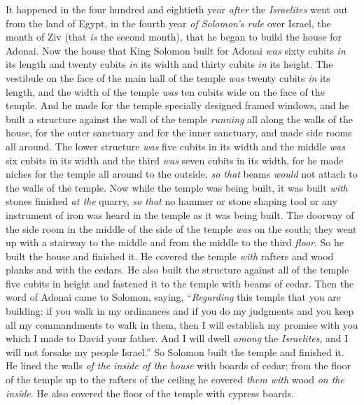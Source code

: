 \begin{biblechapter} %
 It happened in the four hundred and eightieth year \textit{after} the \textit{Israelites} went out from the land of Egypt, in the fourth year \textit{of Solomon’s rule} over Israel, the month of Ziv (that \textit{is} the second month), that he began to build the house for Adonai.
\verse Now the house that King Solomon built for Adonai \textit{was} sixty cubits \textit{in} its length and twenty cubits \textit{in} its width and thirty cubits \textit{in} its height.
\verse The vestibule on the face of the main hall of the temple \textit{was} twenty cubits \textit{in} its length, and the width of the temple \textit{was} ten cubits wide on the face of the temple.
\verse And he made for the temple specially designed framed windows,
\verse and he built a structure against the wall of the temple \textit{running} all along the walls of the house, for the outer sanctuary and for the inner sanctuary, and made side rooms all around.
\verse The lower structure \textit{was} five cubits in its width and the middle \textit{was} six cubits in its width and the third \textit{was} seven cubits in its width, for he made niches for the temple all around to the outside, \textit{so that} beams \textit{would} not attach to the walls of the temple.
\verse Now while the temple was being built, it was built \textit{with} stones finished \textit{at the} quarry, \textit{so that} no hammer or stone shaping tool or any instrument of iron was heard in the temple as it was being built.
\verse The doorway of the side room in the middle of the side of the temple \textit{was} on the south; they went up with a stairway to the middle and from the middle to the third \textit{floor}.
\verse So he built the house and finished it. He covered the temple \textit{with} rafters and wood planks and with the cedars.
\verse He also built the structure against all of the temple five cubits in height and fastened it to the temple with beams of cedar.
\verse Then the word of Adonai came to Solomon, saying,
\verse “\textit{Regarding} this temple that you are building: if you walk in my ordinances and if you do my judgments and you keep all my commandments to walk in them, then I will establish my promise with you which I made to David your father.
\verse And I will dwell \textit{among} the \textit{Israelites}, and I will not forsake my people Israel.”
\verse So Solomon built the temple and finished it.
\verse He lined the walls \textit{of the inside of the house} with boards of cedar; from the floor of the temple up to the rafters of the ceiling he covered \textit{them with} wood \textit{on the inside}. He also covered the floor of the temple with cypress boards.

\end{biblechapter}
